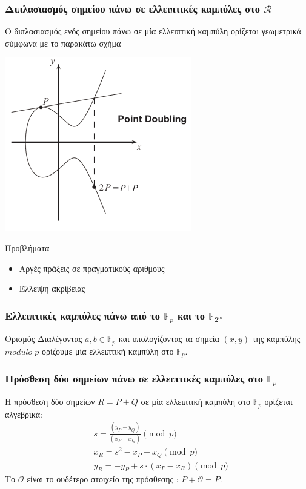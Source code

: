 \documentclass{beamer}
\begin{document}
%
\begin{frame}
\frametitle{Διπλασιασμός σημείου πάνω σε ελλειπτικές καμπύλες στο $\mathcal{R}$}
Ο διπλασιασμός ενός σημείου πάνω σε μία ελλειπτική καμπύλη ορίζεται γεωμετρικά σύμφωνα με το παρακάτω σχήμα
\begin{center}
\includegraphics[scale=0.5]{double.png}

\end{center}\end{frame}

%
\begin{frame}
\begin{block}
{Προβλήματα}
\begin{itemize}
\item Αργές πράξεις σε πραγματικούς αριθμούς
\item Έλλειψη ακρίβειας
\end{itemize}
\end{block}
\end{frame}

%
\begin{frame}
\frametitle{Ελλειπτικές καμπύλες πάνω από το $\mathbb{F}_p$ και το $\mathbb{F}_{2^m}$}
\begin{block}
{Ορισμός}
Διαλέγοντας $a,b \in \mathbb{F}_p$  και υπολογίζοντας τα σημεία $(x,y)$ της καμπύλης $modulo \; p$ ορίζουμε μία ελλειπτική καμπύλη στο $\mathbb{F}_p$.
\end{block}
\end{frame}

%
\begin{frame}
\frametitle{Πρόσθεση δύο σημείων πάνω σε ελλειπτικές καμπύλες στο $\mathbb{F}_p$}
H πρόσθεση δύο σημείων $R = P + Q$ σε μία ελλειπτική καμπύλη στο $\mathbb{F}_p$ ορίζεται αλγεβρικά:
 \begin{align*}
 & s = \frac{(y_P - y_Q)}{(x_P - x_Q)}  \pmod p \\
 & x_R = s^2 - x_P - x_Q \pmod p \\
 & y_R = -y_P + s \cdot (x_P - x_R) \pmod p
 \end{align*}
 \medskip
 Το $\mathcal{O}$ είναι το ουδέτερο στοιχείο της πρόσθεσης : $P + \mathcal{O} = P$.
\end{frame}
\end{document}
